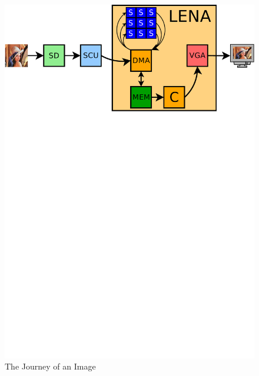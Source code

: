 \begin{figure}[h]
  \centering
  \includegraphics[width=\linewidth,clip,trim=0 20.5cm 0 0]
                  {fig/sys-over/journey.pdf}
  \caption{The Journey of an Image}
  \label{fig:image-journey}
\end{figure}
